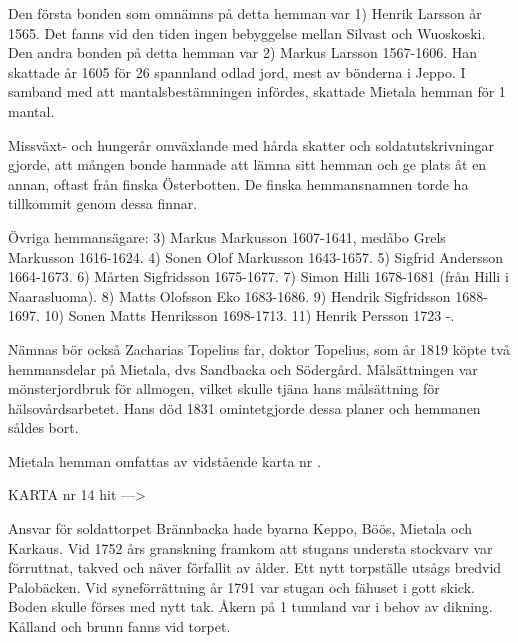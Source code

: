 
Den första bonden som omnämns på detta hemman var 1) Henrik Larsson år 1565. Det fanns vid den tiden ingen bebyggelse mellan Silvast och Wuoskoski. Den andra bonden på detta hemman var 2) Markus Larsson 1567-1606. Han skattade år 1605 för 26 spannland odlad jord, mest av bönderna i Jeppo. I samband med att mantalsbestämningen infördes, skattade Mietala hemman för 1 mantal.

Missväxt- och hungerår omväxlande med hårda skatter och soldatutskrivningar gjorde, att mången bonde hamnade att lämna sitt hemman och ge plats åt en annan, oftast från finska Österbotten. De finska hemmansnamnen torde ha tillkommit genom dessa finnar.

Övriga hemmansägare:  3) Markus Markusson 1607-1641, medåbo Grels Markusson 1616-1624. 4) Sonen Olof Markusson 1643-1657. 5) Sigfrid Andersson 1664-1673. 6) Mårten Sigfridsson 1675-1677. 7) Simon Hilli 1678-1681 (från Hilli i Naarasluoma). 8) Matts Olofsson Eko 1683-1686. 9) Hendrik Sigfridsson 1688-1697. 10) Sonen Matts Henriksson 1698-1713. 11) Henrik Persson 1723 -.

Nämnas bör också  Zacharias Topelius far, doktor Topelius, som år 1819 köpte två hemmansdelar på Mietala, dvs Sandbacka och Södergård. Målsättningen var mönsterjordbruk för allmogen, vilket skulle tjäna hans målsättning för hälsovårdsarbetet. Hans död 1831 omintetgjorde dessa planer och hemmanen såldes bort.


Mietala hemman omfattas av vidstående karta nr .


KARTA nr 14 hit --->



Ansvar för soldattorpet Brännbacka hade byarna Keppo, Böös, Mietala och Karkaus. Vid 1752 års granskning framkom att stugans understa stockvarv var förruttnat, takved och näver förfallit av ålder. Ett nytt torpställe utsågs bredvid Palobäcken. Vid syneförrättning år 1791 var stugan och fähuset i gott skick. Boden skulle förses med nytt tak. Åkern på 1
tunnland var i behov av dikning. Kålland och brunn fanns vid torpet.

